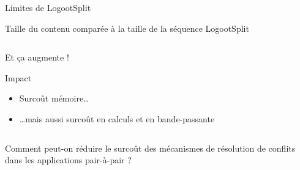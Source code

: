\begin{frame}{Limites de LogootSplit}
\begin{block}{Taille du contenu comparée à la taille de la séquence LogootSplit}
\begin{columns}
\begin{column}{0.4\textwidth}
\begin{center}
                    \alert{Et ça augmente !}
                \end{center}
                \pause
                \begin{block}{Impact}
                    \begin{itemize}
                        \item Surcoût \alert{mémoire}\dots
                        \item \dots mais aussi surcoût en \alert{calculs} et en \alert{bande-passante}
                    \end{itemize}
                \end{block}
            \end{column}
        \end{columns}
    \end{block}
\end{frame}

\begin{frame}[standout]
    Comment peut-on \alert{réduire le surcoût} des mécanismes de résolution de conflits dans les applications pair-à-pair ?
\end{frame}

